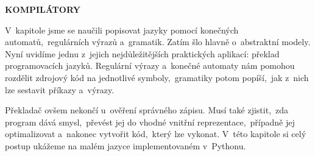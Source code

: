 \documentclass[11pt,a4paper,oneside]{article}
\begin{document}
\begin{center}
    {\huge \textbf{\MakeUppercase{Kompilátory}}}\\[1.2cm]
\end{center}

V~kapitole  jsme se naučili popisovat jazyky pomocí konečných automatů,~regulárních výrazů a~gramatik. Zatím šlo hlavně o~abstraktní modely. Nyní uvidíme jednu z~jejich nejdůležitějších praktických aplikací: překlad programovacích jazyků. Regulární výrazy a~konečné automaty nám pomohou rozdělit zdrojový kód na jednotlivé symboly,~gramatiky potom popíší,~jak z~nich lze sestavit příkazy a~výrazy.

Překladač ovšem nekončí u~ověření správného zápisu. Musí také zjistit,~zda program dává smysl,~převést jej do vhodné vnitřní reprezentace,~případně jej optimalizovat a~nakonec vytvořit kód,~který lze vykonat. V~této kapitole si celý postup ukážeme na malém jazyce implementovaném v~Pythonu.







\end{document}
